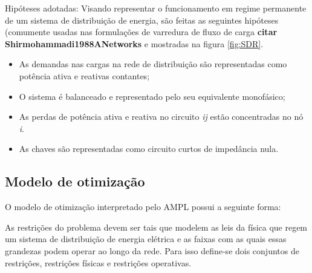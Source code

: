 Hipóteses adotadas:
Visando representar o funcionamento em regime permanente de um sistema de distribuição de energia, são feitas as seguintes hipóteses (comumente usadas nas formulações de varredura de fluxo de carga \textbf{citar Shirmohammadi1988ANetworks} e mostradas na figura \ref{fig:SDR}.

\begin{itemize}
    \item As demandas nas cargas na rede de distribuição são representadas como potência ativa e reativas contantes;
    
    \item O sistema é balanceado e representado pelo seu equivalente monofásico;
    
    \item As perdas de potência ativa e reativa no circuito \textit{ij} estão concentradas no nó \textit{i}.
    
    \item As chaves são representadas como circuito curtos de impedância nula.
\end{itemize}

\subsection{Modelo de otimização}

O modelo de otimização interpretado pelo AMPL possui a seguinte forma:

{\raggedleft
{}}

As restrições do problema devem ser tais que modelem as leis da física que regem um sistema de distribuição de energia elétrica e as faixas com as quais essas grandezas podem operar ao longo da rede.
Para isso define-se dois conjuntos de restrições, restrições físicas e restrições operativas.

